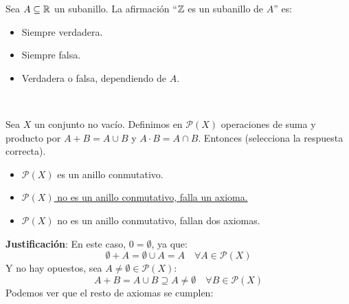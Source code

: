 \begin{ejercicio}
    Sea $A \subseteq \mathbb{R}$ un subanillo. La afirmación ``$\mathbb{Z}$ es un subanillo de $A$'' es:
    \begin{itemize}
        \item Siempre verdadera.
        \item Siempre falsa.
        \item Verdadera o falsa, dependiendo de $A$.
    \end{itemize}
\end{ejercicio}

\newpage
\ %
\resetearcontador

\begin{ejercicio}
    Sea $X$ un conjunto no vacío. Definimos en $\mathcal{P}(X)$ operaciones de suma y producto por $A+B = A \cup B$ y $A \cdot B = A \cap B$. Entonces (selecciona la respuesta correcta).
    \begin{itemize}
        \item $\mathcal{P}(X)$ es un anillo conmutativo.
        \item \underline{$\mathcal{P}(X)$ no es un anillo conmutativo, falla un axioma.}
        \item $\mathcal{P}(X)$ no es un anillo conmutativo, fallan dos axiomas.
    \end{itemize}

    \noindent
    \textbf{Justificación}:
    En este caso, $0 = \emptyset$, ya que:
    \begin{equation*}
        \emptyset + A = \emptyset \cup A = A\quad\forall A \in \mathcal{P}(X)
    \end{equation*}
    Y no hay opuestos, sea $A\neq \emptyset \in \mathcal{P}(X)$:
    \begin{equation*}
        A + B = A \cup B \supseteq A \neq \emptyset\quad\forall B \in \mathcal{P}(X)
    \end{equation*}
    Podemos ver que el resto de axiomas se cumplen:
    

\end{ejercicio}

